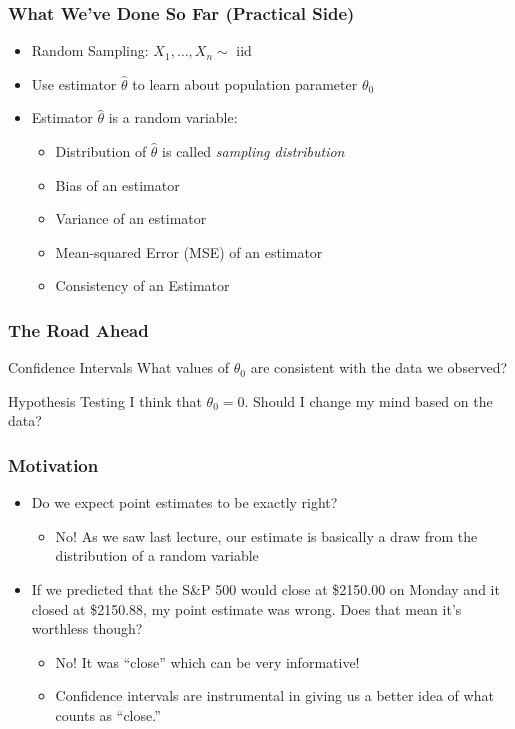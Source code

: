 \documentclass{beamer}
\begin{document}
\begin{frame}
\frametitle{What We've Done So Far (Practical Side)}

\begin{itemize}
\item Random Sampling: $X_1, \hdots, X_n \sim \mbox{ iid}$ 
\item Use estimator $\widehat{\theta}$ to learn about population parameter $\theta_0$ 
\item Estimator $\widehat{\theta}$ is a random variable: 
	\begin{itemize}
		\item Distribution of $\widehat{\theta}$ is called \emph{sampling distribution}
		\item Bias of an estimator 
		\item Variance of an estimator 
		\item Mean-squared Error (MSE) of an estimator 
		\item Consistency of an Estimator
	\end{itemize}
\end{itemize}
\end{frame}

\begin{frame}
\frametitle{The Road Ahead}

\begin{block}{Confidence Intervals}
What values of $\theta_0$ are consistent with the data we observed?
\end{block}

\begin{block}{Hypothesis Testing}
I think that $\theta_0 = 0$. Should I change my mind based on the data?
\end{block}

\end{frame}

\begin{frame}
\frametitle{Motivation}
\begin{itemize}[<+-|alert@+>]
	\item Do we expect point estimates to be exactly right?
	\begin{itemize}
		\item No! As we saw last lecture, our estimate is basically a draw from the distribution of a random variable
	\end{itemize}
	\item If we predicted that the S\&P 500 would close at \$2150.00 on Monday and it closed at \$2150.88, my point estimate was wrong. Does that mean it's worthless though?
	\begin{itemize}
		\item No! It was ``close'' which can be very informative!
		\item Confidence intervals are instrumental in giving us a better idea of what counts as ``close.''
	\end{itemize}
\end{itemize}

\end{frame}
\end{document}
